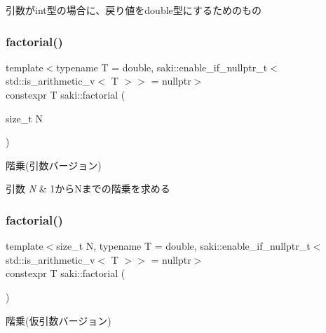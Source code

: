 引数がint型の場合に、戻り値をdouble型にするためのもの 

\mbox{\label{namespacesaki_abc9efa0d579d2d20a9d63ea60b5c6739}} 
\subsubsection{\texorpdfstring{factorial()}{factorial()}\hspace{0.1cm}{\footnotesize\ttfamily [1/2]}}
{\footnotesize\ttfamily template$<$typename T  = double, saki\+::enable\+\_\+if\+\_\+nullptr\+\_\+t$<$ std\+::is\+\_\+arithmetic\+\_\+v$<$ T $>$$>$  = nullptr$>$ \\
constexpr T saki\+::factorial (\begin{DoxyParamCaption}\item[{size\+\_\+t}]{N }\end{DoxyParamCaption})}



階乗(引数バージョン) 


\begin{DoxyParams}{引数}
{\em N} & 1から\+Nまでの階乗を求める \\
\hline
\end{DoxyParams}
\mbox{\label{namespacesaki_a07ba6ea3370958e478c11116a22fa3b8}} 
\subsubsection{\texorpdfstring{factorial()}{factorial()}\hspace{0.1cm}{\footnotesize\ttfamily [2/2]}}
{\footnotesize\ttfamily template$<$size\+\_\+t N, typename T  = double, saki\+::enable\+\_\+if\+\_\+nullptr\+\_\+t$<$ std\+::is\+\_\+arithmetic\+\_\+v$<$ T $>$$>$  = nullptr$>$ \\
constexpr T saki\+::factorial (\begin{DoxyParamCaption}{ }\end{DoxyParamCaption})}



階乗(仮引数バージョン) 

\mbox{\label{namespacesaki_a2cf00e678b37e53b924241bc7ece7b24}} 
